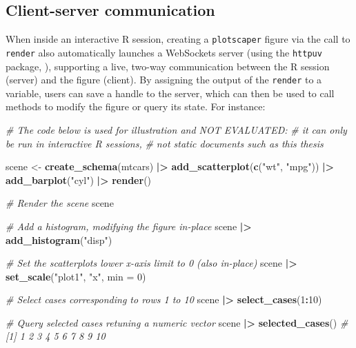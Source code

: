 \documentclass[
  openany]{book}
\newenvironment{Shaded}{\begin{snugshade}}{\end{snugshade}}
\newcommand{\AttributeTok}[1]{\textcolor[rgb]{0.13,0.29,0.53}{#1}}
\newcommand{\CommentTok}[1]{\textcolor[rgb]{0.56,0.35,0.01}{\textit{#1}}}
\newcommand{\DecValTok}[1]{\textcolor[rgb]{0.00,0.00,0.81}{#1}}
\newcommand{\FunctionTok}[1]{\textcolor[rgb]{0.13,0.29,0.53}{\textbf{#1}}}
\newcommand{\NormalTok}[1]{#1}
\newcommand{\OtherTok}[1]{\textcolor[rgb]{0.56,0.35,0.01}{#1}}
\newcommand{\SpecialCharTok}[1]{\textcolor[rgb]{0.81,0.36,0.00}{\textbf{#1}}}
\newcommand{\StringTok}[1]{\textcolor[rgb]{0.31,0.60,0.02}{#1}}
\theoremstyle{definition}
\theoremstyle{definition}
\theoremstyle{definition}
\theoremstyle{definition}
\theoremstyle{remark}
\begin{document}
\subsection{Client-server communication}\label{client-server}

When inside an interactive R session, creating a \texttt{plotscaper} figure via the call to \texttt{render} also automatically launches a WebSockets server (using the \texttt{httpuv} package, ), supporting a live, two-way communication between the R session (server) and the figure (client). By assigning the output of the \texttt{render} to a variable, users can save a handle to the server, which can then be used to call methods to modify the figure or query its state. For instance:

\begin{Shaded}
\begin{Highlighting}[]
\CommentTok{\# The code below is used for illustration and NOT EVALUATED:}
\CommentTok{\# it can only be run in interactive R sessions,}
\CommentTok{\# not static documents such as this thesis}

\NormalTok{scene }\OtherTok{\textless{}{-}} \FunctionTok{create\_schema}\NormalTok{(mtcars) }\SpecialCharTok{|\textgreater{}}
  \FunctionTok{add\_scatterplot}\NormalTok{(}\FunctionTok{c}\NormalTok{(}\StringTok{"wt"}\NormalTok{, }\StringTok{"mpg"}\NormalTok{)) }\SpecialCharTok{|\textgreater{}}
  \FunctionTok{add\_barplot}\NormalTok{(}\StringTok{"cyl"}\NormalTok{) }\SpecialCharTok{|\textgreater{}}
  \FunctionTok{render}\NormalTok{()}

\CommentTok{\# Render the scene}
\NormalTok{scene}

\CommentTok{\# Add a histogram, modifying the figure in{-}place}
\NormalTok{scene }\SpecialCharTok{|\textgreater{}} \FunctionTok{add\_histogram}\NormalTok{(}\StringTok{"disp"}\NormalTok{)}

\CommentTok{\# Set the scatterplot\textquotesingle{}s lower x{-}axis limit to 0 (also in{-}place)}
\NormalTok{scene }\SpecialCharTok{|\textgreater{}} \FunctionTok{set\_scale}\NormalTok{(}\StringTok{"plot1"}\NormalTok{, }\StringTok{"x"}\NormalTok{, }\AttributeTok{min =} \DecValTok{0}\NormalTok{)}

\CommentTok{\# Select cases corresponding to rows 1 to 10}
\NormalTok{scene }\SpecialCharTok{|\textgreater{}} \FunctionTok{select\_cases}\NormalTok{(}\DecValTok{1}\SpecialCharTok{:}\DecValTok{10}\NormalTok{)}

\CommentTok{\# Query selected cases retuning a numeric vector}
\NormalTok{scene }\SpecialCharTok{|\textgreater{}} \FunctionTok{selected\_cases}\NormalTok{() }\CommentTok{\# [1] 1 2 3 4 5 6 7 8 9 10}
\end{Highlighting}
\end{Shaded}
\end{document}
